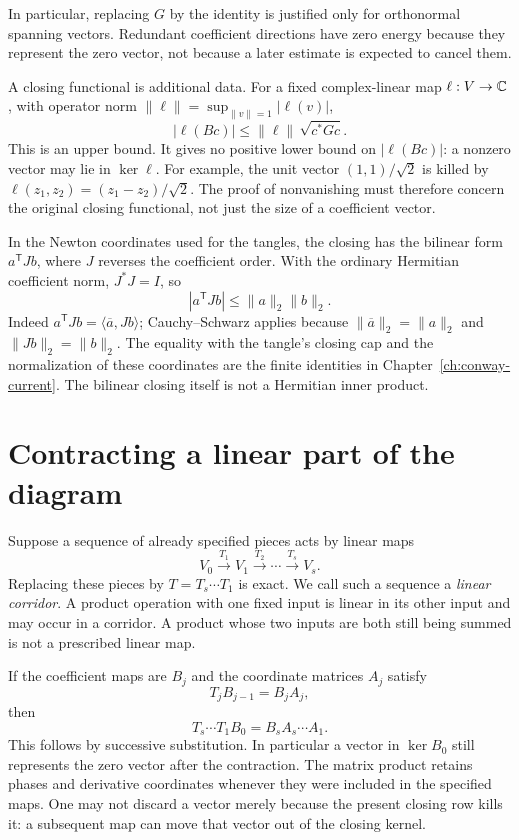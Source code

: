 In particular, replacing $G$ by the identity is justified only for
orthonormal spanning vectors. Redundant coefficient directions have
zero energy because they represent the zero vector, not because a
later estimate is expected to cancel them.

A closing functional is additional data. For a fixed complex-linear
map $\ell:V\to\mathbb C$, with operator norm
$\|\ell\|=\sup_{\|v\|=1}|\ell(v)|$,
\[
 |\ell(Bc)|\le \|\ell\|\,\sqrt{c^*Gc}.
\]
This is an upper bound. It gives no positive lower bound on
$|\ell(Bc)|$: a nonzero vector may lie in $\ker\ell$. For example,
the unit vector $(1,1)/\sqrt2$ is killed by
$\ell(z_1,z_2)=(z_1-z_2)/\sqrt2$.
The proof of nonvanishing must therefore concern the original
closing functional, not just the size of a coefficient vector.

In the Newton coordinates used for the tangles, the closing has the
bilinear form $a^{\mathsf T}Jb$, where $J$ reverses the coefficient
order. With the ordinary Hermitian coefficient norm,
$J^*J=I$, so
\[
 |a^{\mathsf T}Jb|\le\|a\|_2\|b\|_2.
\]
Indeed $a^{\mathsf T}Jb=\langle\overline a,Jb\rangle$;
Cauchy--Schwarz applies because $\|\overline a\|_2=\|a\|_2$ and
$\|Jb\|_2=\|b\|_2$. The equality with the tangle's closing cap
and the normalization of these coordinates are the finite identities in
Chapter~\ref{ch:conway-current}. The bilinear closing itself is not
a Hermitian inner product.

\section{Contracting a linear part of the diagram}

Suppose a sequence of already specified pieces acts by linear maps
\[
 V_0\xrightarrow{T_1}V_1\xrightarrow{T_2}\cdots
       \xrightarrow{T_s}V_s.
\]
Replacing these pieces by $T=T_s\cdots T_1$ is exact. We call such
a sequence a \emph{linear corridor}. A product operation with one
fixed input is linear in its other input and may occur in a
corridor. A product whose two inputs are both still being summed
is not a prescribed linear map.

If the coefficient maps are $B_j$ and the coordinate matrices $A_j$
satisfy
\[
 T_jB_{j-1}=B_jA_j,
\]
then
\[
 T_s\cdots T_1B_0=B_sA_s\cdots A_1.
\]
This follows by successive substitution. In particular a vector
in $\ker B_0$ still represents the zero vector after the contraction.
The matrix product retains phases and derivative coordinates whenever
they were included in the specified maps. One may not discard a vector merely because the present
closing row kills it: a subsequent map can move that vector out of
the closing kernel.

